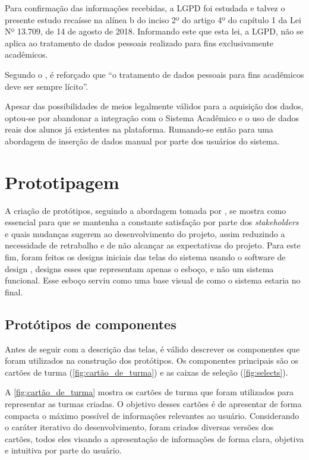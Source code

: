 Para confirmação das informações recebidas, a LGPD foi estudada e talvez o presente estudo recaísse na alínea b do inciso 2º do artigo 4º do capítulo 1 da Lei Nº 13.709, de 14 de agosto de 2018. Informando este que esta lei, a LGPD, não se aplica ao tratamento de dados pessoais realizado para fins exclusivamente acadêmicos.

Segundo o , é reforçado que ``o tratamento de dados pessoais para fins acadêmicos deve ser sempre lícito''.

Apesar das possibilidades de meios legalmente válidos para a aquisição dos dados, optou-se por abandonar a integração com o Sistema Acadêmico e o uso de dados reais dos alunos já existentes na plataforma. Rumando-se então para uma abordagem de inserção de dados manual por parte dos usuários do sistema.

\section{Prototipagem} \label{sec:prototipagem} %

A criação de protótipos, seguindo a abordagem tomada por , se mostra como essencial para que se mantenha a constante satisfação por parte dos \textit{stakeholders} e quais mudanças sugerem ao desenvolvimento do projeto, assim reduzindo a necessidade de retrabalho e de não alcançar as expectativas do projeto. Para este fim, foram feitos os designs iniciais das telas do sistema usando o software de design , designs esses que representam apenas o esboço, e não um sistema funcional. Esse esboço serviu como uma base visual de como o sistema estaria no final.

\subsection{Protótipos de componentes} \label{ssec:componentes} %

Antes de seguir com a descrição das telas, é válido descrever os componentes que foram utilizados na construção dos protótipos. Os componentes principais são os cartões de turma (\autoref{fig:cartão_de_turma}) e as caixas de seleção (\autoref{fig:selects}).

A \autoref{fig:cartão_de_turma} mostra os cartões de turma que foram utilizados para representar as turmas criadas. O objetivo desses cartões é de apresentar de forma compacta o máximo possível de informações relevantes ao usuário. Considerando o caráter iterativo do desenvolvimento, foram criados diversas versões dos cartões, todos eles visando a apresentação de informações de forma clara, objetiva e intuitiva por parte do usuário.

